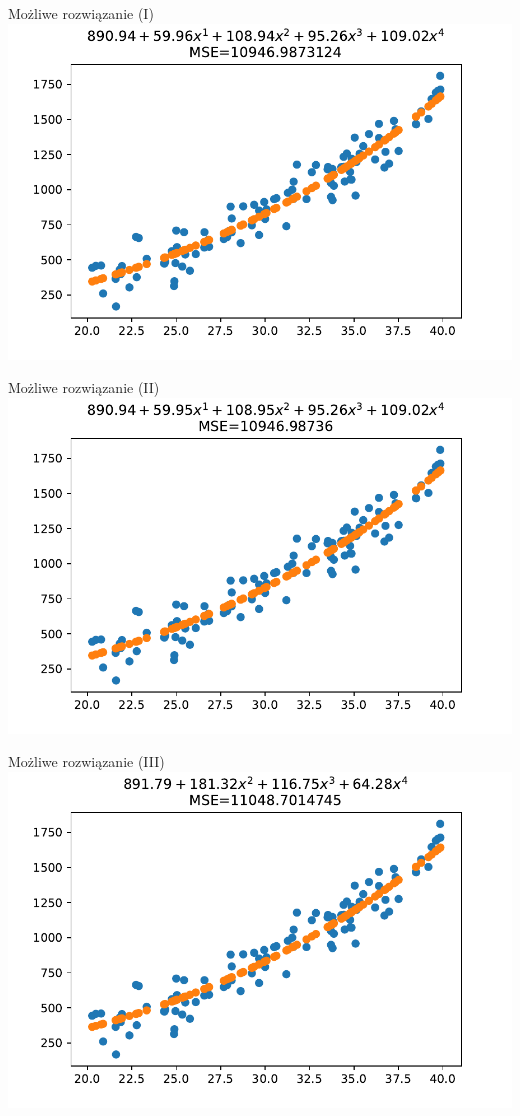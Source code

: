 \documentclass{sa}
\begin{document}
\begin{frame}{Możliwe rozwiązanie (I)}
\includegraphics[width=\textwidth]{reg-3deg-with-noise-lasso0.pdf}
\end{frame}
\begin{frame}{Możliwe rozwiązanie (II)}
\includegraphics[width=\textwidth]{reg-3deg-with-noise-lasso0_001.pdf}
\end{frame}
\begin{frame}{Możliwe rozwiązanie (III)}
\includegraphics[width=\textwidth]{reg-3deg-with-noise-lasso10.pdf}
\end{frame}
\end{document}
